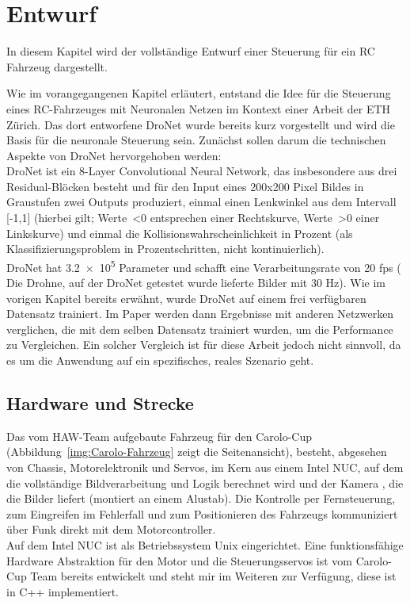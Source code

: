 %
\chapter{Entwurf}
In diesem Kapitel wird der vollständige Entwurf einer Steuerung für ein RC Fahrzeug dargestellt.

Wie im vorangegangenen Kapitel erläutert, entstand die Idee für die Steuerung eines RC-Fahrzeuges mit Neuronalen Netzen im Kontext einer Arbeit der ETH Zürich.
Das dort entworfene DroNet wurde bereits kurz vorgestellt und wird die Basis für die neuronale Steuerung sein. Zunächst sollen darum die technischen Aspekte von DroNet hervorgehoben werden: \\

DroNet ist ein 8-Layer Convolutional Neural Network, das insbesondere aus drei Residual-Blöcken besteht und für den Input eines 200x200 Pixel Bildes in Graustufen zwei Outputs produziert, einmal einen Lenkwinkel aus dem Intervall [-1,1] (hierbei gilt; Werte~<0 entsprechen einer Rechtskurve, Werte~>0 einer Linkskurve)  und einmal die Kollisionswahrscheinlichkeit in Prozent (als Klassifizierungsproblem in Prozentschritten, nicht kontinuierlich).\\
DroNet hat \num{3.2e5} Parameter und schafft eine Verarbeitungsrate von 20 fps ( Die Drohne, auf der DroNet getestet wurde lieferte Bilder mit 30 Hz).
Wie im vorigen Kapitel bereits erwähnt, wurde DroNet auf einem frei verfügbaren Datensatz trainiert. Im Paper werden dann Ergebnisse mit anderen Netzwerken verglichen, die mit dem selben Datensatz trainiert wurden, um die Performance zu Vergleichen. Ein solcher Vergleich ist für diese Arbeit jedoch nicht sinnvoll, da es um die Anwendung auf ein spezifisches, reales Szenario geht. 

\section{Hardware und Strecke}

Das vom HAW-Team aufgebaute Fahrzeug für den Carolo-Cup (Abbildung~\ref{img:Carolo-Fahrzeug} zeigt die Seitenansicht), besteht, abgesehen von Chassis, Motorelektronik und Servos, im Kern aus einem Intel NUC, auf dem die vollständige Bildverarbeitung und Logik berechnet wird und der Kamera , die die Bilder liefert (montiert an einem Alustab). Die Kontrolle per Fernsteuerung, zum Eingreifen im Fehlerfall und zum Positionieren des Fahrzeugs kommuniziert über Funk direkt mit dem Motorcontroller.\\
Auf dem Intel NUC ist als Betriebssystem Unix eingerichtet.
Eine funktionsfähige Hardware Abstraktion für den Motor und die Steuerungsservos ist vom Carolo-Cup Team bereits entwickelt und steht mir im Weiteren zur Verfügung, diese ist in C++ implementiert.\\

